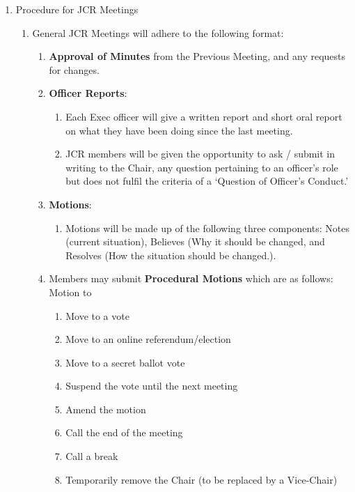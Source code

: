 \label{sc: JCR Meetings}
\begin{enumerate}
    \item Procedure for JCR Meetings
    \begin{enumerate}
        \item General JCR Meetings will adhere to the following format:
        \begin{enumerate}
            \item \textbf{Approval of Minutes} from the Previous Meeting, and any requests for changes.
            \item \textbf{Officer Reports}:
            \begin{enumerate}
                \item Each Exec officer will give a written report and short oral report on what
                they have been doing since the last meeting.
                \item JCR members will be given the opportunity to ask / submit in writing to the Chair, any question pertaining to an officer’s role but does not fulfil the criteria of a ‘Question of Officer’s Conduct.’
            \end{enumerate}
            \item \textbf{Motions}:
            \begin{enumerate}
                \item Motions will be made up of the following three components: Notes (current situation), Believes (Why it should be changed, and Resolves (How the situation should be changed.).
            \end{enumerate}
            \item Members may submit \textbf{Procedural Motions} which are as follows: Motion to
            \begin{enumerate}
                \item Move to a vote
                \item Move to an online referendum/election
                \item Move to a secret ballot vote
                \item Suspend the vote until the next meeting
                \item Amend the motion
                \item Call the end of the meeting
                \item Call a break
                \item Temporarily remove the Chair (to be replaced by a Vice-Chair)

\end{enumerate}
\end{enumerate}
\end{enumerate}
\end{enumerate}
